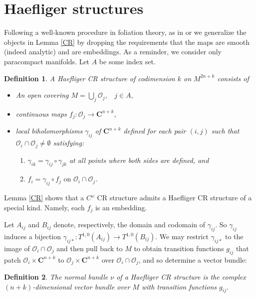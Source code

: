 \documentclass{amsart}
\newtheorem{definition}{Definition}
\begin{document}
\section{Haefliger  structures}\label{Haefliger}

Following a well-known procedure in foliation theory, as in
\cite{Lawson} or \cite {Milnor} we generalize the objects in Lemma
\ref{CR} by dropping the requirements that the maps are smooth (indeed
analytic) and are embeddings.  As a reminder, we consider only paracompact manifolds.  
Let $A$ be some index set.

\begin{definition}
A Haefliger  CR structure of codimension $k$ on $M^{2n+k}$ consists of 

\begin{itemize}
\item 
An open covering $M=\bigcup _j {\mathcal{O}} _j$,\ \ $j\in A,$
\item 
continuous maps $f_j:{\mathcal{O}} _j \to {\mathbf{C}} ^{n+k}$, 
\item  
local biholomorphisms $\gamma _{ij}$ of ${\mathbf{C}} ^{n+k} $ defined for each pair $(i,j)$ such that ${\mathcal{O}} _i\cap {\mathcal{O}} _j\neq \emptyset$ satisfying:
\begin{enumerate}
\item 
$\gamma _{ik}=\gamma _{ij}\circ \gamma _{jk}$ at all points where both sides are defined, and

\item 
$f_i=\gamma _{ij}\circ f_j \text{ on } {\mathcal{O}} _i\cap {\mathcal{O}}_j$.
\end{enumerate}
\end{itemize}
\end{definition}
  
Lemma \ref{CR} shows that a $C^\omega$ CR structure admits a Haefliger  CR structure of a special kind.  Namely, each $f_j$ is an embedding.  

Let $A_{ij}$ and $B_{ij}$ denote, respectively, the domain and codomain of $\gamma _{ij}$.   So
 $\gamma _{ij}$ induces a bijection $\gamma _{ij*}: T^{1,0}(A_{ij})\to T^{1,0}(B_{ij})$.  We may restrict $\gamma _{ij*}$ to the image of ${\mathcal{O}} _i\cap {\mathcal{O}} _j$ and then pull back to $ M$ to obtain transition functions $g_{ij}$ that patch ${\mathcal{O}} _i\times {\mathbf{C}^{n+k}}$ to ${\mathcal{O}} _j\times {\mathbf{C}^{n+k}} $ over ${\mathcal{O}} _i\cap {\mathcal{O}}_j$, and so determine a vector bundle:

\begin{definition}
The normal bundle $\nu$ of a Haefliger  CR structure is the complex $(n+k)$-dimensional 
vector bundle over $M$ with transition functions $g_{ij}$.
\end{definition}
\end{document}
